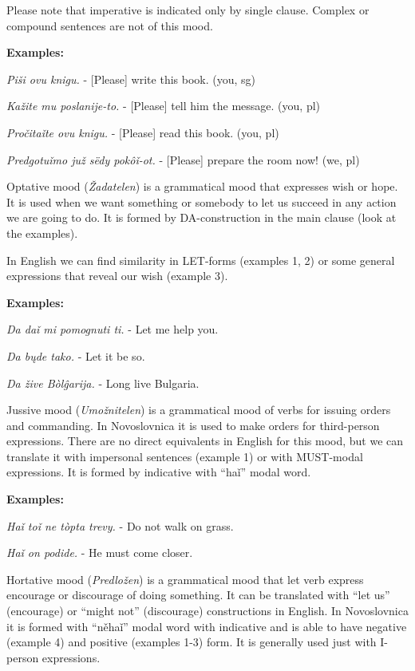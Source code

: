 Please note that imperative is indicated only by single clause. Complex or compound sentences are not of this mood.

\textbf{Examples:}

\textit{Piši ovu knigu.} - [Please] write this book. (you, sg)

\textit{Kažite mu poslanije-to.} - [Please] tell him the message. (you, pl)

\textit{Pročitaǐte ovu knigu.} - [Please] read this book. (you, pl)

\textit{Predgotuǐmo juž sëdy pokôǐ-ot.} - [Please] prepare the room now! (we, pl)

Optative mood (\textit{Žadatelen}) is a grammatical mood that expresses wish or hope. It is used when we want something or somebody to let us succeed in any action we are going to do. It is formed by DA-construction in the main clause (look at the examples). 

In English we can find similarity in LET-forms (examples 1, 2) or some general expressions that reveal our wish (example 3).

\textbf{Examples:}

\textit{Da daǐ mi pomognuti ti.} - Let me help you.

\textit{Da bųde tako.} - Let it be so.

\textit{Da žive Bòlĝarija.} - Long live Bulgaria.

Jussive mood (\textit{Umožnitelen}) is a grammatical mood of verbs for issuing orders and commanding. In Novoslovnica it is used to make orders for third-person expressions. There are no direct equivalents in English for this mood, but we can translate it with impersonal sentences (example 1) or with MUST-modal expressions. It is formed by indicative with “haǐ” modal word.

\textbf{Examples:}

\textit{Haǐ toǐ ne tòpta trevy.} - Do not walk on grass.

\textit{Haǐ on podide.} - He must come closer.

Hortative mood (\textit{Predložen})  is a grammatical mood that let verb express encourage or discourage of doing something. It can be translated with “let us” (encourage) or “might not” (discourage) constructions in English. In Novoslovnica it is formed with “něhaǐ” modal word with indicative and is able to have negative (example 4) and positive (examples 1-3) form. It is generally used just with I-person expressions.

